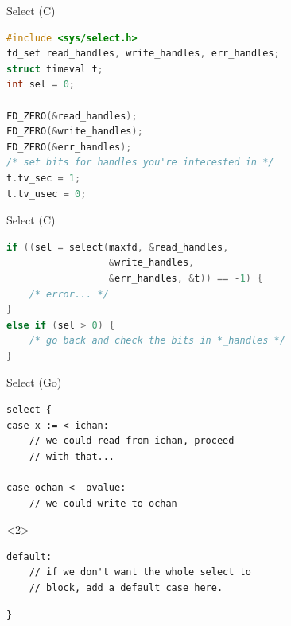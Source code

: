\documentclass[pdf,t]{beamer}
\begin{document}
\begin{frame}[fragile]{Select (C)}
\begin{lstlisting}[language=c]
#include <sys/select.h>
fd_set read_handles, write_handles, err_handles;
struct timeval t;
int sel = 0;

FD_ZERO(&read_handles);
FD_ZERO(&write_handles);
FD_ZERO(&err_handles);
/* set bits for handles you're interested in */
t.tv_sec = 1;
t.tv_usec = 0;
\end{lstlisting}
\end{frame}
\begin{frame}[fragile]{Select (C)}
\begin{lstlisting}[language=c]
if ((sel = select(maxfd, &read_handles, 
                  &write_handles, 
                  &err_handles, &t)) == -1) {
    /* error... */
}
else if (sel > 0) {
    /* go back and check the bits in *_handles */
}
\end{lstlisting}
\end{frame}
\begin{frame}[fragile]{Select (Go)}
\begin{lstlisting}
select {
case x := <-ichan:
    // we could read from ichan, proceed
    // with that...

case ochan <- ovalue:
    // we could write to ochan
\end{lstlisting}
\begin{onlyenv}<2>
\begin{lstlisting}
default:
    // if we don't want the whole select to
    // block, add a default case here.
\end{lstlisting}
\end{onlyenv}
\begin{lstlisting}
}
\end{lstlisting}
\end{frame}
\end{document}
